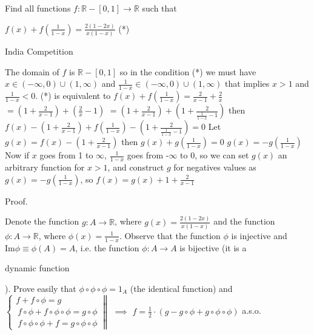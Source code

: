 \begin{mysolution}
	\begin{tcolorbox}Find all functions $ f:\mathbb{R}-[0,1]\to\mathbb{R}$ such that 

$ f(x)+f\left(\frac{1}{1-x}\right) =\frac{2(1-2x)}{x(1-x)}$ (*)

India Competition\end{tcolorbox}

The domain of $ f$ is $ \mathbb{R}-[0,1]$ so in the condition (*) we must have $ x\in (-\infty,0)\cup(1,\infty)$ and $ \frac{1}{1-x}\in (-\infty,0)\cup(1,\infty)$ that implies $ x>1$ and $ \frac{1}{1-x}<0$.
(*) is equivalent to
$ f(x)+f\left(\frac{1}{1-x}\right) =\frac{2}{x-1}+\frac{2}{x}$
$ =\left(1+\frac{2}{x-1}\right)+\left(\frac{2}{x}-1\right)$
$ =\left(1+\frac{2}{x-1}\right)+\left(1+\frac{2}{\frac{1}{1-x}-1}\right)$
then
$ f(x)-\left(1+\frac{2}{x-1}\right)+f\left(\frac{1}{1-x}\right)-\left(1+\frac{2}{\frac{1}{1-x}-1}\right) =0$
Let $ g(x)=f(x)-\left(1+\frac{2}{x-1}\right)$
then
$ g(x)+g\left(\frac{1}{1-x}\right)=0$
$ g(x)=-g\left(\frac{1}{1-x}\right)$
Now if $ x$ goes from 1 to $ \infty$, $ \frac{1}{1-x}$ goes from -$ \infty$ to 0, so we can set $ g(x)$ an arbitrary function for $ x>1$, and construct $ g$ for negatives values as $ g(x)=-g\left(\frac{1}{1-x}\right)$, so $ f(x)=g(x)+1+\frac{2}{x-1}$
\end{mysolution}



\begin{mysolution}

\begin{bolded}Proof.\end{bolded} Denote the function $ g: A\to\mathbb R$, where $ g(x) =\frac{2(1-2x)}{x(1-x)}$ and the function $ \phi : A\to\mathbb R$, where $ \phi (x) =\frac{1}{1-x}$.
Observe that the function $ \phi$ is injective and $ \mathrm{Im}\phi\equiv\phi (A) = A$, i.e. the function $ \phi : A\to A$ is bijective (it is a \begin{bolded}dynamic function\end{bolded}).
Prove easily that $ \phi\circ\phi\circ\phi = 1_{A}$ (the identical function) and $ \left\{\begin{array}{c}f+f\circ\phi = g\\ \ f\circ\phi+f\circ\phi\circ\phi = g\circ\phi\\ \ f\circ\phi\circ\phi+f = g\circ\phi\circ\phi\end{array}\right\|$ $ \implies$ $ f =\frac{1}{2}\cdot (g-g\circ\phi+g\circ\phi\circ\phi )$ a.s.o.
\end{mysolution}



